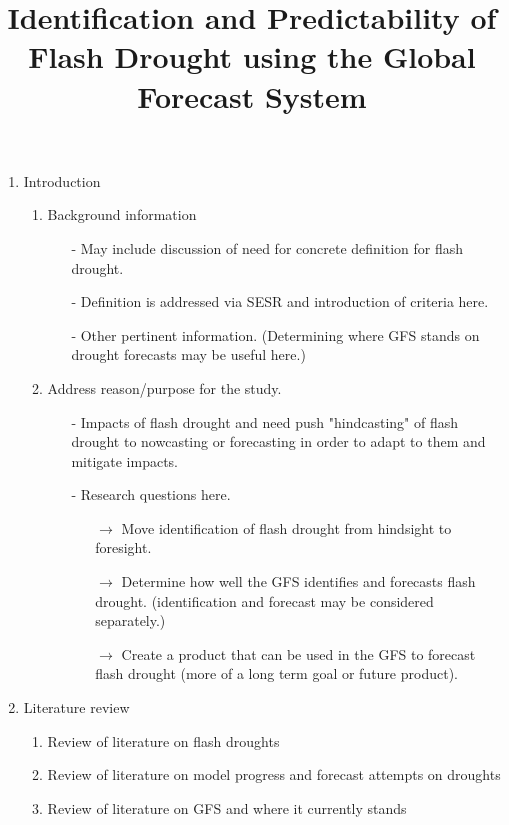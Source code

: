 \documentclass[12pt, letterpaper]{article}
\title{Identification and Predictability of Flash Drought using the Global Forecast%
       System} %
\date{} %
\begin{document}
  \maketitle %

  \begin{enumerate}
    \item Introduction 
    \begin{enumerate}
      \item Background information
      \begin{itemize}
        \item[-] May include discussion of need for concrete definition for flash drought.
        \item[-] Definition is addressed via SESR and introduction of criteria here.
        \item[-] Other pertinent information. (Determining where GFS stands on drought
                 forecasts may be useful here.)
      \end{itemize}
      
      \item Address reason/purpose for the study.
      \begin{itemize}
        \item[-] Impacts of flash drought and need push "hindcasting" of flash drought
                 to nowcasting or forecasting in order to adapt to them and mitigate impacts.
        \item[-] Research questions here.
        \begin{itemize}
          \item[$\rightarrow$] Move identification of flash drought from hindsight to foresight.
          \item[$\rightarrow$] Determine how well the GFS identifies and forecasts flash drought.
                             (identification and forecast may be considered separately.)
          \item[$\rightarrow$] Create a product that can be used in the GFS to forecast flash
                             drought (more of a long term goal or future product).
        \end{itemize}
      \end{itemize}
    \end{enumerate}
      
    \item Literature review
    \begin{enumerate}
      \item Review of literature on flash droughts
      \item Review of literature on model progress and forecast attempts on droughts
      \item Review of literature on GFS and where it currently stands
    \end{enumerate}


\end{enumerate}
\end{document}
